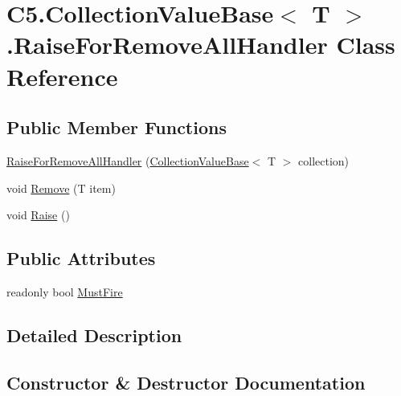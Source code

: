 \hypertarget{class_c5_1_1_collection_value_base_1_1_raise_for_remove_all_handler}{}\section{C5.\+Collection\+Value\+Base$<$ T $>$.Raise\+For\+Remove\+All\+Handler Class Reference}
\label{class_c5_1_1_collection_value_base_1_1_raise_for_remove_all_handler}


 


\subsection*{Public Member Functions}
\begin{DoxyCompactItemize}
\item 
\hyperlink{class_c5_1_1_collection_value_base_1_1_raise_for_remove_all_handler_ac545cf16a7633eee202d54be0e7a8bb3}{Raise\+For\+Remove\+All\+Handler} (\hyperlink{class_c5_1_1_collection_value_base}{Collection\+Value\+Base}$<$ T $>$ collection)
\item 
void \hyperlink{class_c5_1_1_collection_value_base_1_1_raise_for_remove_all_handler_a3758d128c0d359c2ac2d27bcfa97ac8d}{Remove} (T item)
\item 
void \hyperlink{class_c5_1_1_collection_value_base_1_1_raise_for_remove_all_handler_adb4765ff76faad1bdcf8353d93f8740e}{Raise} ()
\end{DoxyCompactItemize}
\subsection*{Public Attributes}
\begin{DoxyCompactItemize}
\item 
readonly bool \hyperlink{class_c5_1_1_collection_value_base_1_1_raise_for_remove_all_handler_a876003f948d28b14e91f6d8a3a796651}{Must\+Fire}
\end{DoxyCompactItemize}


\subsection{Detailed Description}




\subsection{Constructor \& Destructor Documentation}
\hypertarget{class_c5_1_1_collection_value_base_1_1_raise_for_remove_all_handler_ac545cf16a7633eee202d54be0e7a8bb3}{}
